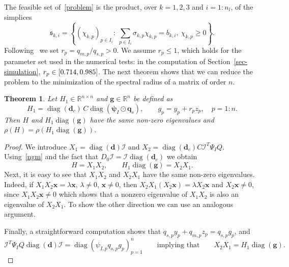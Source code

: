 \documentclass[11pt]{article}
\theoremstyle{plain}
\newtheorem{theorem}{Theorem}[section]
\theoremstyle{remark}
\numberwithin{equation}{section}
\begin{document}
The feasible set of~\eqref{problem} is the product, over $k=1,2,3$ and
$i=1:n_l$, of the simplices
\begin{equation}\label{simplices}
\mathfrak{s}_{k,i}=\left\{(\chi_{k,p})_{p\in I_i}:\ \sum_{p\in I_i}\sigma_{k,p}\chi_{k,p}=b_{k,i},\
\chi_{k,p}\ge 0\right\}.
\end{equation}
Following~\cite{2026Feng_Day_Glasser} we set $r_p=q_{m,p}/q_{s,p}>0$. We assume $r_p\le 1$, which holds for the parameter set used in the numerical tests: in the computation of Section~\ref{sec-simulation}, $r_p\in[0.714,0.985]$.  The next theorem shows that we can reduce the problem to the minimization of the spectral radius of a matrix of order $n$.
\begin{theorem}\label{reduction}
Let $H_1\in\mathbb{R}^{n\times n}$ and $\bm{g}\in\mathbb{R}^n$ be defined as
\begin{equation}\label{a1-g}
H_1=\operatorname{diag}(\bm d_c)\,C\operatorname{diag}\left(\bm\psi_I\odot\bm q_s\right),
\qquad g_p=y_p+r_pz_p,\quad p=1:n.
\end{equation}
Then $H$ and $H_1\operatorname{diag}(\bm g)$ have the same non-zero
eigenvalues and 
\(\rho\left(H\right)=\rho\left(H_1\operatorname{diag}(\bm g)\right)\).
\end{theorem}
\begin{proof}
We introduce $X_1=\operatorname{diag}(\bm d)\mathcal{I}$ and $X_2=\operatorname{diag}(\bm d_c)C\mathcal{I}^T\Psi_IQ$. Using~\eqref{ngm} and the fact that
$D_0\mathcal{I}=\mathcal{I}\operatorname{diag}(\bm d_c)$ we obtain
\begin{equation*}
H=X_1X_2,\qquad H_1\operatorname{diag}(\bm g)=X_2X_1.
\end{equation*}
Next, it is easy to see that $X_1X_2$ and $X_2X_1$ have the same non-zero eigenvalues. 
Indeed, if
$X_1X_2\bm x=\lambda\bm x$, $\lambda\ne 0$, $\bm x\ne 0$, then
$X_2X_1(X_2\bm x)=\lambda X_2\bm x$ and $X_2\bm x\ne 0$, since
$X_1X_2\bm x\ne 0$ which shows that a nonzero eigenvalue of $X_1X_2$ is also an eigenvalue of $X_2X_1$. To show the other direction we can use an analogous argument. 

Finally, a straightforward computation shows that $q_{s,p}y_p+q_{m,p}z_p=q_{s,p}g_p$, and
\begin{equation*}
\mathcal{I}^T\Psi_IQ\operatorname{diag}(\bm d)\mathcal{I}
=\operatorname{diag}\left(\psi_{I,p}q_{s,p}g_p\right)_{p=1}^n
\qquad\mbox{implying that}\qquad X_2X_1=H_1\operatorname{diag}(\bm g).
\end{equation*}
\end{proof}
\end{document}

